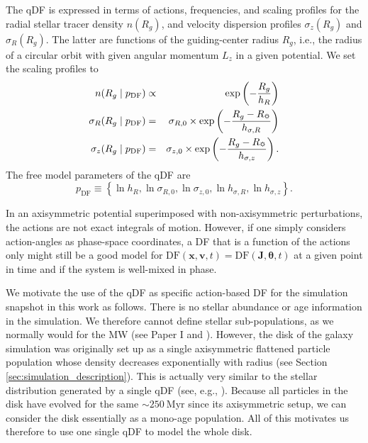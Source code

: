 \documentclass[iop,revtex4,numberedappendix,appendixfloats]{emulateapj}
\newcommand{\vect}[1]{\boldsymbol{#1}}
\begin{document}
The qDF is expressed in terms of actions, frequencies, and scaling profiles for the radial stellar tracer density $n(R_g)$, and velocity dispersion profiles $\sigma_z(R_g)$ and $\sigma_R(R_g)$. The latter are functions of the guiding-center radius $R_g$, i.e., the radius of a circular orbit with given angular momentum $L_z$ in a given potential. We set the scaling profiles to
\begin{eqnarray}
n(R_g \mid p_\text{DF}) &\propto& \exp\left(-\frac{R_g}{h_R} \right)\\
\sigma_R(R_g \mid p_\text{DF}) &=& \sigma_{R,0} \times \exp\left(- \frac{R_g-R_\text{\sun}}{h_{\sigma,R}} \right)\label{eq:sigmaRRg}\\
\sigma_z(R_g \mid p_\text{DF}) &=& \sigma_{z,0} \times \exp\left(- \frac{R_g-R_\text{\sun}}{h_{\sigma,z}} \right)\label{eq:sigmazRg}.
\end{eqnarray}
The free model parameters of the qDF are
\begin{equation}
p_\text{DF} \equiv \left\{ \ln h_R, \ln \sigma_{R,0}, \ln \sigma_{z,0}, \ln h_{\sigma,R}, \ln h_{\sigma,z}\right\}. \label{eq:qDF_parameters}
\end{equation}

In an axisymmetric potential superimposed with non-axisymmetric perturbations, the actions are not exact integrals of motion. However, if one simply considers action-angles as phase-space coordinates, a DF that is a function of the actions only might still be a good model for $\text{DF}(\vect{x},\vect{v},t)= \text{DF}(\vect{J},\vect{\theta},t)$ at a given point in time and if the system is well-mixed in phase.

We motivate the use of the qDF as specific action-based DF for the simulation snapshot in this work as follows. There is no stellar abundance or age information in the simulation. We therefore cannot define stellar sub-populations, as we normally would for the MW (see Paper I and \citealt{2013ApJ...779..115B}). However, the disk of the galaxy simulation was originally set up as a single axisymmetric flattened particle population whose density decreases exponentially with radius (see Section \ref{sec:simulation_description}). This is actually very similar to the stellar distribution generated by a single qDF (see, e.g., \citealt{2013MNRAS.434..652T}). Because all particles in the disk have evolved for the same $\sim 250~\text{Myr}$ since its axisymmetric setup, we can consider the disk essentially as a mono-age population. All of this motivates us therefore to use one single qDF to model the whole disk.
\end{document}
